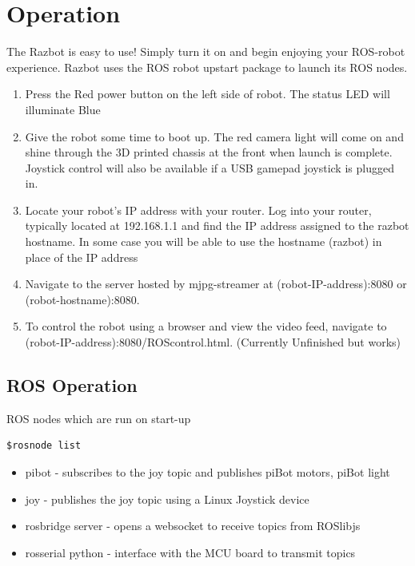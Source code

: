 \documentclass[12pt,titlepage,oneside]{memoir}
\begin{document}
\chapter{Operation}

The Razbot is easy to use! Simply turn it on and begin enjoying your ROS-robot experience.
Razbot uses the ROS robot upstart package to launch its ROS nodes.

\begin{enumerate}
\item Press the Red power button on the left side of robot. The status LED will illuminate Blue
\item Give the robot some time to boot up. The red camera light will come on and shine through the 3D printed chassis at the front when launch is complete. Joystick control will also be available if a USB gamepad joystick is plugged in.
\item Locate your robot's IP address with your router. Log into your router, typically located at 192.168.1.1 and find the IP address assigned to the razbot hostname. In some case you will be able to use the hostname (razbot) in place of the IP address
\item Navigate to the server hosted by mjpg-streamer at  (robot-IP-address):8080 or (robot-hostname):8080.
\item To control the robot using a browser and view the video feed, navigate to (robot-IP-address):8080/ROScontrol.html. (Currently Unfinished but works)
\end{enumerate}

\section{ROS Operation}

ROS nodes which are run on start-up
\begin{verbatim}
$rosnode list
\end{verbatim}

\begin{itemize}
\item pibot - subscribes to the joy topic and publishes piBot motors, piBot light
\item joy - publishes the joy topic using a Linux Joystick device
\item rosbridge server - opens a websocket to receive topics from ROSlibjs
\item rosserial python - interface with the MCU board to transmit topics
\end{itemize}
\end{document}
